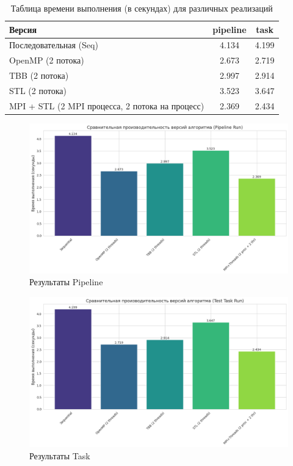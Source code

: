 \documentclass[12pt]{article}
\begin{document}
\begin{table}[h!]
    \centering
    \begin{tabular}{|l|c|c|}
        \hline
        \textbf{Версия} & \textbf{pipeline} & \textbf{task} \\
        \hline
        Последовательная (Seq) & 4.134 & 4.199 \\
        \hline
        OpenMP (2 потока) & 2.673 & 2.719 \\
        \hline
        TBB (2 потока) & 2.997 & 2.914 \\
        \hline
        STL (2 потока) & 3.523 & 3.647 \\
        \hline
        MPI + STL (2 MPI процесса, 2 потока на процесс) & 2.369 & 2.434 \\
        \hline
    \end{tabular}
    \caption{Таблица времени выполнения (в секундах) для различных реализаций}
\end{table}

\begin{figure}[h]
    \centering
    \includegraphics[width=1\textwidth]{pipeline.png}
    \caption{Результаты Pipeline}
\end{figure}

\begin{figure}[h]
    \centering 
    \includegraphics[width=1\textwidth]{task.png}
    \caption{Результаты Task}
\end{figure}
\clearpage
\end{document}
